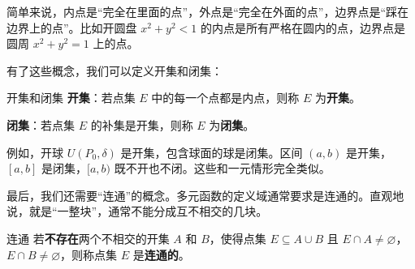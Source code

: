 简单来说，内点是“完全在里面的点”，外点是“完全在外面的点”，边界点是“踩在边界上的点”。比如开圆盘 $x^2+y^2 < 1$ 的内点是所有严格在圆内的点，边界点是圆周 $x^2+y^2=1$ 上的点。

有了这些概念，我们可以定义开集和闭集：

\begin{definition}{开集和闭集}{}
\textbf{开集}：若点集 $E$ 中的每一个点都是内点，则称 $E$ 为\textbf{开集}。

\textbf{闭集}：若点集 $E$ 的补集是开集，则称 $E$ 为\textbf{闭集}。
\end{definition}

例如，开球 $U(P_0, \delta)$ 是开集，包含球面的球是闭集。区间 $(a,b)$ 是开集，$[a,b]$ 是闭集，$[a,b)$ 既不开也不闭。这些和一元情形完全类似。

最后，我们还需要“连通”的概念。多元函数的定义域通常要求是连通的。直观地说，就是“一整块”，通常不能分成互不相交的几块。

\begin{definition}{连通}{}
  若\textbf{不存在}两个不相交的开集 $A$ 和 $B$，使得点集 $E \subseteq A \cup B$ 且 $E \cap A \neq \varnothing$，$E \cap B \neq \varnothing$，则称点集 $E$ 是\textbf{连通的}。
\end{definition}

